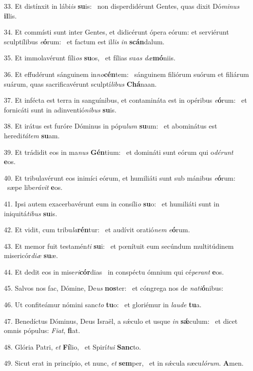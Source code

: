 33. Et distínxit in lábi\textit{is} \textbf{su}is: \ast\  non disperdidérunt Gentes, quas dixit Dó\textit{mi}\textit{nus} \textbf{il}lis.\

34. Et commísti sunt inter Gentes, et didicérunt ópera eórum: et serviérunt sculptílibus \textit{e}\textbf{ó}rum: \ast\  et factum est il\textit{lis} \textit{in} \textbf{scán}dalum.\

35. Et immolavérunt fíli\textit{os} \textbf{su}os, \ast\  et fílias su\textit{as} \textit{dæ}\textbf{mó}niis.\

36. Et effudérunt sánguinem in\textit{no}\textbf{cén}tem: \ast\  sánguinem filiórum suórum et filiárum suárum, quas sacrificavérunt sculptí\textit{li}\textit{bus} \textbf{Chá}naan.\

37. Et infécta est terra in sanguínibus, et contamináta est in opéribus \textit{e}\textbf{ó}rum: \ast\  et fornicáti sunt in adinventió\textit{ni}\textit{bus} \textbf{su}is.\

38. Et irátus est furóre Dóminus in pópu\textit{lum} \textbf{su}um: \ast\  et abominátus est heredi\textit{tá}\textit{tem} \textbf{su}am.\

39. Et trádidit eos in ma\textit{nus} \textbf{Gén}tium: \ast\  et domináti sunt eórum qui o\textit{dé}\textit{runt} \textbf{e}os.\

40. Et tribulavérunt eos inimíci eórum, et humiliáti sunt sub mánibus \textit{e}\textbf{ó}rum: \ast\  sæpe libe\textit{rá}\textit{vit} \textbf{e}os.\

41. Ipsi autem exacerbavérunt eum in consíli\textit{o} \textbf{su}o: \ast\  et humiliáti sunt in iniquitá\textit{ti}\textit{bus} \textbf{su}is.\

42. Et vidit, cum tribu\textit{la}\textbf{rén}tur: \ast\  et audívit oratió\textit{nem} \textit{e}\textbf{ó}rum.\

43. Et memor fuit testamén\textit{ti} \textbf{su}i: \ast\  et pœnítuit eum secúndum multitúdinem misericór\textit{di}\textit{æ} \textbf{su}æ.\

44. Et dedit eos in mise\textit{ri}\textbf{cór}dias \ast\  in conspéctu ómnium qui cé\textit{pe}\textit{rant} \textbf{e}os.\

45. Salvos nos fac, Dómine, De\textit{us} \textbf{nos}ter: \ast\  et cóngrega nos de \textit{na}\textit{ti}\textbf{ó}nibus:\

46. Ut confiteámur nómini sanc\textit{to} \textbf{tu}o: \ast\  et gloriémur in \textit{lau}\textit{de} \textbf{tu}a.\

47. Benedíctus Dóminus, Deus Israël, a sǽculo et usque \textit{in} \textbf{sǽ}culum: \ast\  et dicet omnis pópulus: \textit{Fi}\textit{at}, \textbf{fi}at.\

48. Glória Patri, \textit{et} \textbf{Fí}lio, \ast\  et Spirí\textit{tu}\textit{i} \textbf{Sanc}to.\

49. Sicut erat in princípio, et nunc, \textit{et} \textbf{sem}per, \ast\  et in sǽcula sæcu\textit{ló}\textit{rum}. \textbf{A}men.\


